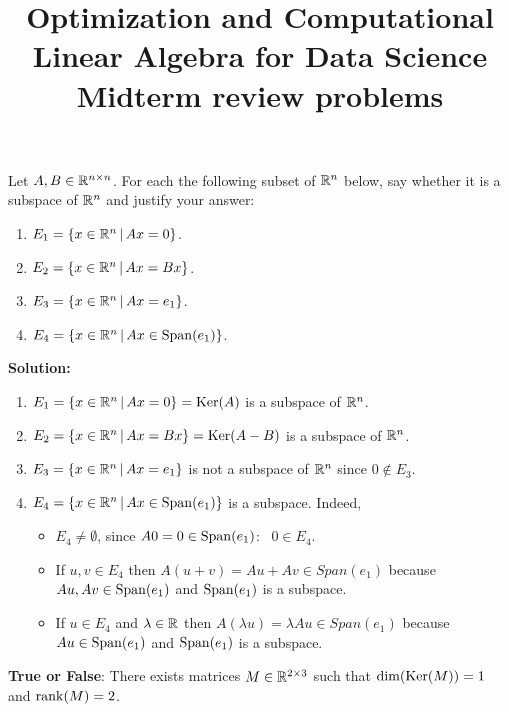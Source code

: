 \documentclass[11pt,nocut]{article}
\title{\vspace{-2.0cm}%
	Optimization and Computational Linear Algebra for Data Science\\
Midterm review problems}
\date{}
\begin{document}
\maketitle


\begin{problem}
	Let $A,B \in \mathbb{R}^{n \times n}$. For each the following subset of $\mathbb{R}^n$ below, say whether it is a subspace of $\mathbb{R}^n$ and justify your answer:
	\begin{enumerate}
		\item $E_1 = \{ x \in \mathbb{R}^n \, | \, Ax = 0 \}$.
		\item $E_2 = \{ x \in \mathbb{R}^n \, | \, Ax = Bx \}$.
		\item $E_3 = \{ x \in \mathbb{R}^n \, | \, Ax = e_1 \}$.
		\item $E_4 = \{ x \in \mathbb{R}^n \, | \, Ax \in {{\rm Span}}(e_1) \}$.
	\end{enumerate}
\end{problem}

\textbf{Solution:}
	\begin{enumerate}
		\item $E_1 = \{ x \in \mathbb{R}^n \, | \, Ax = 0 \} = {{\rm Ker}}(A)$ is a subspace of $\mathbb{R}^n$.
		\item $E_2 = \{ x \in \mathbb{R}^n \, | \, Ax = Bx \}= {{\rm Ker}}(A-B)$ is a subspace of $\mathbb{R}^n$.
		\item $E_3 = \{ x \in \mathbb{R}^n \, | \, Ax = e_1 \}$ is not a subspace of $\mathbb{R}^n$ since $0 \not\in E_3$.
		\item $E_4 = \{ x \in \mathbb{R}^n \, | \, Ax \in {{\rm Span}}(e_1) \}$ is a subspace. Indeed, 
			\begin{itemize}
				\item $E_4 \neq \emptyset$, since $A0 = 0 \in {{\rm Span}}(e_1)$: \ $0 \in E_4$.
				\item If $u,v \in E_4$ then $A(u+v) = Au + Av \in Span(e_1)$ because $Au, Av \in {{\rm Span}}(e_1)$ and ${{\rm Span}}(e_1)$ is a subspace.
				\item If $u\in E_4$ and $\lambda \in \mathbb{R}$ then $A(\lambda u) = \lambda Au \in Span(e_1)$ because $Au \in {{\rm Span}}(e_1)$ and ${{\rm Span}}(e_1)$ is a subspace.
			\end{itemize}
	\end{enumerate}

\vspace{0.2cm}

\begin{problem}
	\textbf{True or False}: There exists matrices $M \in \mathbb{R}^{2 \times 3}$ such that ${{\rm dim}}({{\rm Ker}}(M))=1$ and ${{\rm rank}}(M)=2$.
\end{problem}
\end{document}
